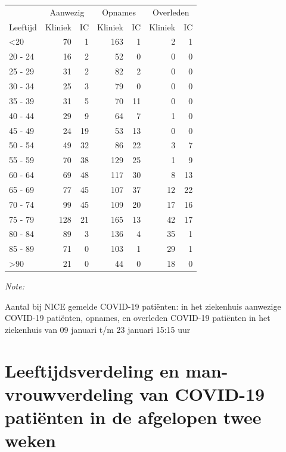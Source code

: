 \documentclass[
  english,
  man,floatsintext]{apa6}
\begin{document}
\begin{table}
\centering\begingroup\fontsize{10}{12}\selectfont

\begin{threeparttable}
\begin{tabular}{lrrrrrr}
\toprule
\multicolumn{1}{c}{ } & \multicolumn{2}{c}{Aanwezig} & \multicolumn{2}{c}{Opnames} & \multicolumn{2}{c}{Overleden} \\
\cmidrule(l{3pt}r{3pt}){2-3} \cmidrule(l{3pt}r{3pt}){4-5} \cmidrule(l{3pt}r{3pt}){6-7}
Leeftijd & Kliniek & IC & Kliniek & IC & Kliniek & IC\\
\midrule
<20 & 70 & 1 & 163 & 1 & 2 & 1\\
20 - 24 & 16 & 2 & 52 & 0 & 0 & 0\\
25 - 29 & 31 & 2 & 82 & 2 & 0 & 0\\
30 - 34 & 25 & 3 & 79 & 0 & 0 & 0\\
35 - 39 & 31 & 5 & 70 & 11 & 0 & 0\\
40 - 44 & 29 & 9 & 64 & 7 & 1 & 0\\
45 - 49 & 24 & 19 & 53 & 13 & 0 & 0\\
50 - 54 & 49 & 32 & 86 & 22 & 3 & 7\\
55 - 59 & 70 & 38 & 129 & 25 & 1 & 9\\
60 - 64 & 69 & 48 & 117 & 30 & 8 & 13\\
65 - 69 & 77 & 45 & 107 & 37 & 12 & 22\\
70 - 74 & 99 & 45 & 109 & 20 & 17 & 16\\
75 - 79 & 128 & 21 & 165 & 13 & 42 & 17\\
80 - 84 & 89 & 3 & 136 & 4 & 35 & 1\\
85 - 89 & 71 & 0 & 103 & 1 & 29 & 1\\
>90 & 21 & 0 & 44 & 0 & 18 & 0\\
\bottomrule
\end{tabular}
\begin{tablenotes}
\item \textit{Note: } 
\item Aantal bij NICE gemelde COVID-19 patiënten: in het ziekenhuis aanwezige COVID-19 patiënten, opnames, en overleden COVID-19 patiënten in het ziekenhuis van 09 januari t/m 23 januari 15:15 uur
\end{tablenotes}
\end{threeparttable}
\endgroup{}
\end{table}

\newpage

\hypertarget{leeftijdsverdeling-en-man-vrouwverdeling-van-covid-19-patiuxebnten-in-de-afgelopen-twee-weken}{%
\section{Leeftijdsverdeling en man-vrouwverdeling van COVID-19 patiënten in de afgelopen twee weken}\label{leeftijdsverdeling-en-man-vrouwverdeling-van-covid-19-patiuxebnten-in-de-afgelopen-twee-weken}}
\end{document}
